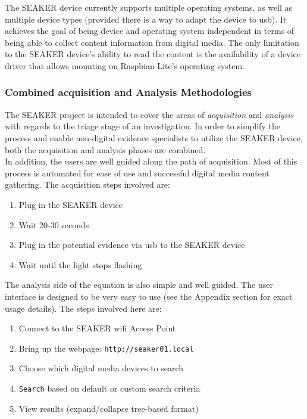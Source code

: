 \documentclass[12pt]{article}
\begin{document}
The SEAKER device currently supports multiple operating systems, as well as multiple
device types (provided there is a way to adapt the device to \gls{usb}). It achieves the goal of
being device and operating system independent in terms of being able to collect content
information from digital media. The only limitation to the SEAKER device's ability
to read the content is the availability of a device driver that allows mounting on Raspbian
Lite's operating system.\\

\subsubsection{Combined acquisition and Analysis Methodologies}

The SEAKER project is intended to cover the areas of {\em acquisition} and {\em analysis}
with regards to the triage stage of an investigation.  In order to simplify the process and
enable non-digital evidence specialists to utilize the SEAKER device, both the
acquisition and analysis phases are combined.\\

In addition, the users are well guided along the path of acquisition.  Most of this process is
automated for ease of use and successful digital media content gathering.  The acquisition 
steps involved are:

\vspace{0.5 cm}
\begin{enumerate}
  \item Plug in the SEAKER device
  \item Wait 20-30 seconds
  \item Plug in the potential evidence via \gls{usb} to the SEAKER device
  \item Wait until the light stops flashing
\end{enumerate}
\vspace{0.5 cm}

The analysis side of the equation is also simple and well guided.  The user interface is 
designed to be very easy to use (see the Appendix section for exact usage details).  The steps
involved here are:

\vspace{0.5 cm}
\begin{enumerate}
  \item Connect to the SEAKER \gls{wifi} Access Point
  \item Bring up the webpage: {\tt http://seaker01.local}
  \item Choose which digital media devices to search
  \item \verb|Search| based on default or custom search criteria
  \item View results (expand/collapse tree-based format)
\end{enumerate}
\vspace{0.5 cm}
\end{document}

